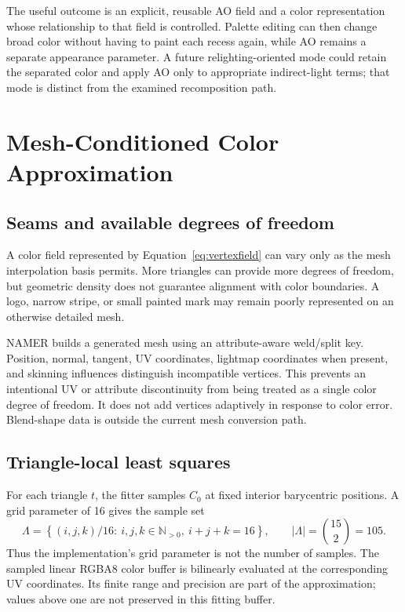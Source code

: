 \documentclass[11pt,letterpaper]{article}
\begin{document}
The useful outcome is an explicit, reusable AO field and a color representation whose relationship to that field is controlled. Palette editing can then change broad color without having to paint each recess again, while AO remains a separate appearance parameter. A future relighting-oriented mode could retain the separated color and apply AO only to appropriate indirect-light terms; that mode is distinct from the examined recomposition path.

\section{Mesh-Conditioned Color Approximation}
\subsection{Seams and available degrees of freedom}
A color field represented by Equation~\eqref{eq:vertexfield} can vary only as the mesh interpolation basis permits. More triangles can provide more degrees of freedom, but geometric density does not guarantee alignment with color boundaries. A logo, narrow stripe, or small painted mark may remain poorly represented on an otherwise detailed mesh.

NAMER builds a generated mesh using an attribute-aware weld/split key. Position, normal, tangent, UV coordinates, lightmap coordinates when present, and skinning influences distinguish incompatible vertices. This prevents an intentional UV or attribute discontinuity from being treated as a single color degree of freedom. It does not add vertices adaptively in response to color error. Blend-shape data is outside the current mesh conversion path.

\subsection{Triangle-local least squares}
For each triangle $t$, the fitter samples $C_0$ at fixed interior barycentric positions. A grid parameter of 16 gives the sample set
\begin{equation}
\Lambda=\left\{(i,j,k)/16:\ i,j,k\in\mathbb{N}_{>0},\ i+j+k=16\right\},
\qquad |\Lambda|=\binom{15}{2}=105.
\label{eq:grid}
\end{equation}
Thus the implementation's grid parameter is not the number of samples. The sampled linear RGBA8 color buffer is bilinearly evaluated at the corresponding UV coordinates. Its finite range and precision are part of the approximation; values above one are not preserved in this fitting buffer.
\end{document}
